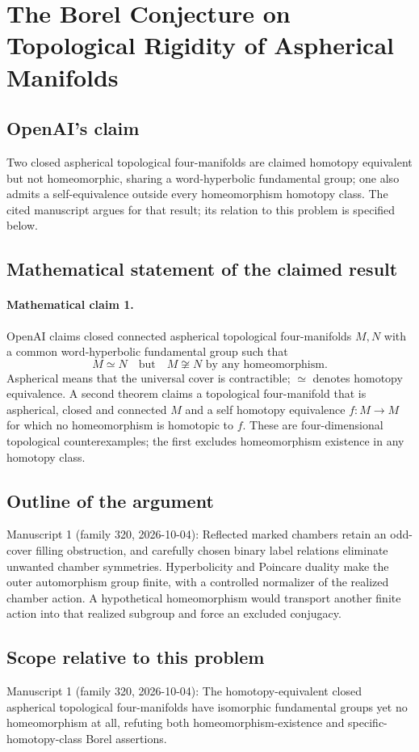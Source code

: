 \documentclass[11pt]{article}
\begin{document}
\section*{The Borel Conjecture on Topological Rigidity of Aspherical Manifolds}

\subsection{OpenAI's claim}
Two closed aspherical topological four-manifolds are claimed homotopy equivalent but not homeomorphic, sharing a word-hyperbolic fundamental group; one also admits a self-equivalence outside every homeomorphism homotopy class. The cited manuscript argues for that result; its relation to this problem is specified below.

\subsection{Mathematical statement of the claimed result}
\paragraph{Mathematical claim 1.} OpenAI claims closed connected aspherical topological four-manifolds $M,N$ with a common word-hyperbolic fundamental group such that
\[
M\simeq N\quad\text{but}\quad M\not\cong N\text{ by any homeomorphism}.
\]
Aspherical means that the universal cover is contractible; $\simeq$ denotes homotopy equivalence. A second theorem claims a topological four-manifold that is aspherical, closed and connected $M$ and a self homotopy equivalence $f:M\to M$ for which no homeomorphism is homotopic to $f$. These are four-dimensional topological counterexamples; the first excludes homeomorphism existence in any homotopy class.

\subsection{Outline of the argument}
Manuscript 1 (family 320, 2026-10-04): Reflected marked chambers retain an odd-cover filling obstruction, and carefully chosen binary label relations eliminate unwanted chamber symmetries. Hyperbolicity and Poincare duality make the outer automorphism group finite, with a controlled normalizer of the realized chamber action. A hypothetical homeomorphism would transport another finite action into that realized subgroup and force an excluded conjugacy.

\subsection{Scope relative to this problem}
Manuscript 1 (family 320, 2026-10-04): The homotopy-equivalent closed aspherical topological four-manifolds have isomorphic fundamental groups yet no homeomorphism at all, refuting both homeomorphism-existence and specific-homotopy-class Borel assertions.
\end{document}
